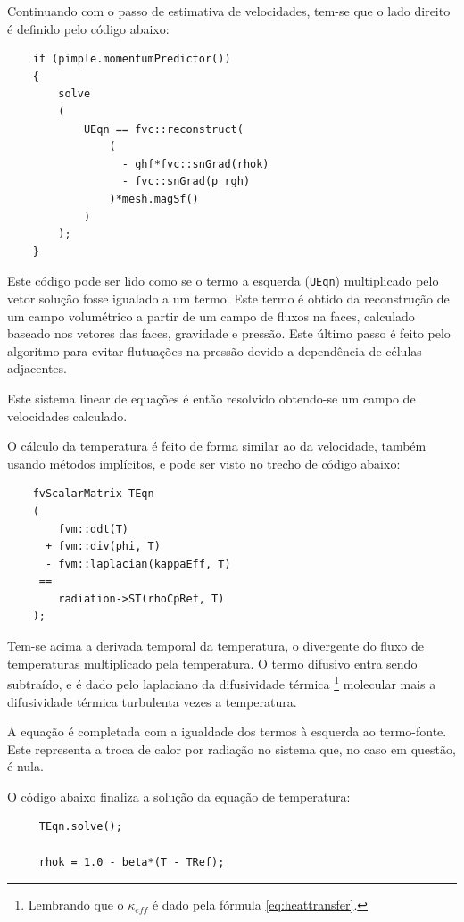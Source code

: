 \documentclass[12pt,openright,twoside,a4paper,english,french,spanish,brazil]{abntex2}
\begin{document}


Continuando com o passo de estimativa de velocidades, tem-se que o lado direito é definido pelo 
código abaixo:

\begin{verbatim}
    if (pimple.momentumPredictor())
    {
        solve
        (
            UEqn == fvc::reconstruct(
                (
                  - ghf*fvc::snGrad(rhok)
                  - fvc::snGrad(p_rgh)
                )*mesh.magSf()
            )
        );
    }
\end{verbatim}

Este código pode ser lido como se o termo a esquerda (\texttt{UEqn}) multiplicado pelo 
vetor solução fosse igualado a um termo. Este termo é obtido da reconstrução de um campo 
volumétrico a partir de um campo de fluxos na faces, calculado baseado nos vetores das
faces, gravidade e pressão. Este último passo é feito pelo algoritmo para evitar flutuações 
na pressão devido a dependência de células adjacentes.

Este sistema linear de equações é então resolvido obtendo-se um campo de velocidades calculado.

O cálculo da temperatura é feito de forma similar ao da velocidade, também usando métodos implícitos, e 
pode ser visto no trecho de código abaixo:


\begin{verbatim}
    fvScalarMatrix TEqn
    (
        fvm::ddt(T)
      + fvm::div(phi, T)
      - fvm::laplacian(kappaEff, T)
     ==
        radiation->ST(rhoCpRef, T)
    );
\end{verbatim}

Tem-se acima a derivada temporal da temperatura, o divergente do fluxo de temperaturas 
multiplicado pela temperatura. O termo difusivo entra sendo subtraído, e é dado pelo laplaciano 
da difusividade térmica \footnote{Lembrando que o $\kappa_{eff}$ é dado pela fórmula \ref{eq:heattransfer}.} 
molecular mais a difusividade térmica turbulenta
vezes a temperatura. 

A equação é completada com a igualdade dos termos à esquerda ao termo-fonte. Este representa a 
troca de calor por radiação no sistema que, no caso em questão, é nula.

O código abaixo finaliza a solução da equação de temperatura:

\begin{verbatim}
     TEqn.solve();
 
     rhok = 1.0 - beta*(T - TRef);
\end{verbatim}
\end{document}
